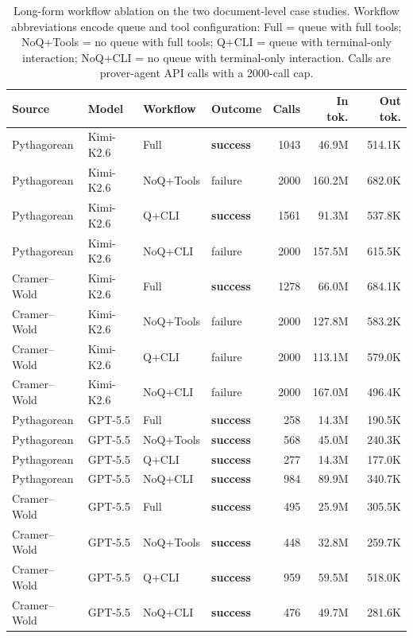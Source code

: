 \documentclass{article}
\newcommand{\kimi}{Kimi-K2.6\xspace}
\newcommand{\gpt}{GPT-5.5\xspace}
\begin{document}
\begin{table}[t]
\centering
\caption{Long-form workflow ablation on the two document-level case studies. Workflow abbreviations encode queue and tool configuration: Full = queue with full tools; NoQ+Tools = no queue with full tools; Q+CLI = queue with terminal-only interaction; NoQ+CLI = no queue with terminal-only interaction. Calls are prover-agent API calls with a 2000-call cap.}
\label{tab:longform-ablation}
\footnotesize
\setlength{\tabcolsep}{3pt}
\begin{tabular*}{\textwidth}{@{\extracolsep{\fill}}llllrrr@{}}
\toprule
Source & Model & Workflow & Outcome & Calls & In tok. & Out tok. \\
\midrule
Pythagorean & \kimi & Full & \textbf{success} & 1043 & 46.9M & 514.1K \\
Pythagorean & \kimi & NoQ+Tools & failure & 2000 & 160.2M & 682.0K \\
Pythagorean & \kimi & Q+CLI & \textbf{success} & 1561 & 91.3M & 537.8K \\
Pythagorean & \kimi & NoQ+CLI & failure & 2000 & 157.5M &  615.5K \\
Cramer--Wold & \kimi & Full & \textbf{success} & 1278 & 66.0M & 684.1K \\
Cramer--Wold & \kimi & NoQ+Tools & failure & 2000 & 127.8M & 583.2K \\
Cramer--Wold & \kimi & Q+CLI & failure & 2000 & 113.1M & 579.0K \\
Cramer--Wold & \kimi & NoQ+CLI & failure & 2000 & 167.0M  & 496.4K \\
\midrule
Pythagorean & \gpt & Full & \textbf{success} & 258 & 14.3M & 190.5K \\
Pythagorean & \gpt & NoQ+Tools & \textbf{success} & 568 & 45.0M & 240.3K \\
Pythagorean & \gpt & Q+CLI & \textbf{success} & 277 & 14.3M & 177.0K \\
Pythagorean & \gpt & NoQ+CLI & \textbf{success} & 984 & 89.9M & 340.7K \\
Cramer--Wold & \gpt & Full & \textbf{success} & 495 & 25.9M  & 305.5K\\
Cramer--Wold & \gpt & NoQ+Tools & \textbf{success} & 448 & 32.8M & 259.7K \\
Cramer--Wold & \gpt & Q+CLI & \textbf{success} & 959 & 59.5M & 518.0K \\
Cramer--Wold & \gpt & NoQ+CLI & \textbf{success} & 476 & 49.7M & 281.6K \\
\bottomrule
\end{tabular*}
\end{table}
\end{document}

